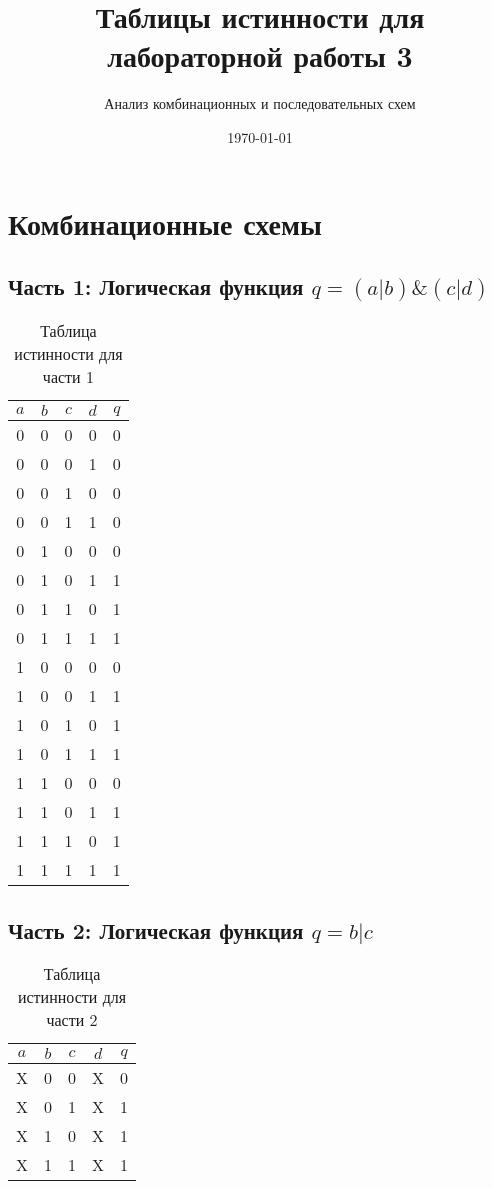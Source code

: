 \documentclass[12pt,a4paper]{article}
\title{Таблицы истинности для лабораторной работы 3}
\author{Анализ комбинационных и последовательных схем}
\date{\today}
\begin{document}
\maketitle

\section{Комбинационные схемы}

\subsection{Часть 1: Логическая функция $q = (a | b) \& (c | d)$}

\begin{table}[h]
\centering
\caption{Таблица истинности для части 1}
\begin{tabular}{|c|c|c|c|c|}
\hline
$a$ & $b$ & $c$ & $d$ & $q$ \\
\hline
0 & 0 & 0 & 0 & 0 \\
0 & 0 & 0 & 1 & 0 \\
0 & 0 & 1 & 0 & 0 \\
0 & 0 & 1 & 1 & 0 \\
0 & 1 & 0 & 0 & 0 \\
0 & 1 & 0 & 1 & 1 \\
0 & 1 & 1 & 0 & 1 \\
0 & 1 & 1 & 1 & 1 \\
1 & 0 & 0 & 0 & 0 \\
1 & 0 & 0 & 1 & 1 \\
1 & 0 & 1 & 0 & 1 \\
1 & 0 & 1 & 1 & 1 \\
1 & 1 & 0 & 0 & 0 \\
1 & 1 & 0 & 1 & 1 \\
1 & 1 & 1 & 0 & 1 \\
1 & 1 & 1 & 1 & 1 \\
\hline
\end{tabular}
\end{table}

\subsection{Часть 2: Логическая функция $q = b | c$}

\begin{table}[h]
\centering
\caption{Таблица истинности для части 2}
\begin{tabular}{|c|c|c|c|c|}
\hline
$a$ & $b$ & $c$ & $d$ & $q$ \\
\hline
X & 0 & 0 & X & 0 \\
X & 0 & 1 & X & 1 \\
X & 1 & 0 & X & 1 \\
X & 1 & 1 & X & 1 \\
\hline
\end{tabular}
\end{table}
\end{document}
